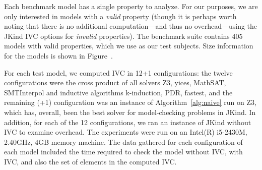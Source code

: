 Each benchmark model has a single property to analyze.  For our purposes, we are only interested in models with a {\em valid} property (though it is perhaps worth noting that there is no additional computation---and thus no overhead---using the JKind IVC options for {\em invalid} properties).  The benchmark suite contains 405 models with valid properties, which we use as our test subjects.  Size information for the models is shown in Figure~.  

For each test model, we computed IVC in 12+1 configurations: the twelve configurations were the cross product of all solvers {Z3, yices, MathSAT, SMTInterpol} and inductive algorithms {k-induction, PDR, fastest}, and the remaining (+1) configuration was an instance of Algorithm~\ref{alg:naive} run on Z3, which has, overall, been the best solver for model-checking problems in JKind.  In addition, for each of the 12 configurations, we ran an instance of JKind without IVC to examine overhead.  The experiments were run on an Intel(R) i5-2430M, 2.40GHz, 4GB memory machine.  The data gathered for each configuration of each model included the time required to check the model without IVC, with IVC, and also the set of elements in the computed IVC.

\iffalse
\begin{itemize}
    \item an algorithm to compute a truly minimal set of support, i.e. \texttt{JSupport}.
    \item given a LUS model, a static crawler which automatically marks all equations of a node in the initial support set of a property.
    \item some trackers that measure the verification time with/ without support computation.
\end{itemize}

\mike{My thoughts on this section: mostly, it needs more structure: more information on the properties of the models: size, provenance, etc., a broken out subsection on the description of the experimental setup, etc}

\mike{I think we want to split out the results in another top-level section}

Experiment:
\begin{itemize}
    \item (Overview) describe research questions and goals.
    \item Experimental setup: tell me about the models: how many, how big are they?  Then, tell me about the experiment: the tool configurations, the machine used for test.
    \item Data generation: Describe what you measured for each model analysis.
\end{itemize}
\fi

